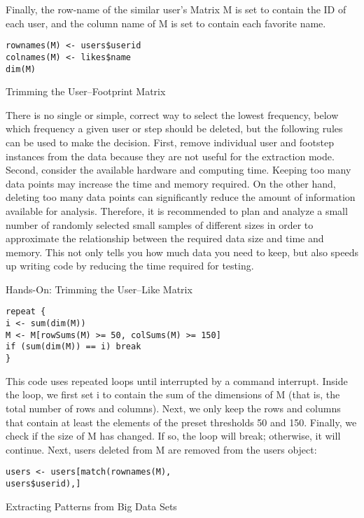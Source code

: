 Finally, the row-name of the similar user's Matrix M is set to 
contain the ID of each user, and the column name of M is set to 
contain each favorite name.

\begin{verbatim}
rownames(M) <- users$userid
colnames(M) <- likes$name
dim(M)
\end{verbatim}

Trimming the User–Footprint Matrix

There is no single or simple, correct way to select the lowest 
frequency, below which frequency a given user or step should be 
deleted, but the following rules can be used to make the decision.
 First, remove individual user and footstep instances from the 
data because they are not useful for the extraction mode. Second, 
consider the available hardware and computing time. Keeping too 
many data points may increase the time and memory required. On the
 other hand, deleting too many data points can significantly reduce
 the amount of information available for analysis. Therefore, it is
 recommended to plan and analyze a small number of randomly 
selected small samples of different sizes in order to approximate 
the relationship between the required data size and time and 
memory. This not only tells you how much data you need to keep, 
but also speeds up writing code by reducing the time required for 
testing.

Hands-On: Trimming the User–Like Matrix

\begin{verbatim}
repeat {
i <- sum(dim(M))
M <- M[rowSums(M) >= 50, colSums(M) >= 150]
if (sum(dim(M)) == i) break
}
\end{verbatim}

This code uses repeated loops until interrupted by a command 
interrupt. Inside the loop, we first set i to contain the sum of 
the dimensions of M (that is, the total number of rows and 
columns). Next, we only keep the rows and columns that contain at 
least the elements of the preset thresholds 50 and 150. Finally, 
we check if the size of M has changed. If so, the loop will break;
 otherwise, it will continue.
Next, users deleted from M are removed from the users object:

\begin{verbatim}
users <- users[match(rownames(M),
users$userid),]
\end{verbatim}

Extracting Patterns from Big Data Sets

